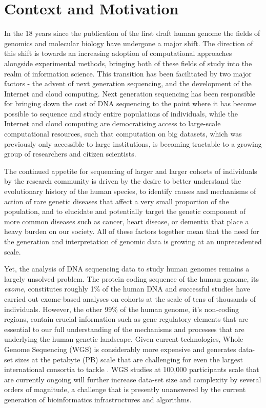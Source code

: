 \section{Context and Motivation}
In the 18 years since the publication of the first draft human genome\autocite{lander2001initial} the fields of genomics and molecular biology have undergone a major shift. The direction of this shift is towards an increasing adoption of computational approaches alongside experimental methods, bringing both of these fields of study into the realm of information science. This transition has been facilitated by two major factors - the advent of next generation sequencing\autocite{schuster2007next}, and the development of the Internet and cloud computing\autocite{buyya2009cloud}. Next generation sequencing has been responsible for bringing down the cost of DNA sequencing to the point where it has become possible to sequence and study entire populations of individuals\autocite{gudbjartsson2015large}, while the Internet and cloud computing are democratising access to large-scale computational resources, such that computation on big datasets, which was previously only accessible to large institutions, is becoming tractable to a growing group of researchers and citizen scientists.

The continued appetite for sequencing of larger and larger cohorts of individuals by the research community is driven by the desire to better understand the evolutionary history of the human species\autocite{jobling2013human}, to identify causes and mechanisms of action of rare genetic diseases that affect a very small proportion of the population\autocite{boycott2013rare}, and to elucidate and potentially target the genetic component of more common diseases such as cancer\autocite{weinstein2013cancer}, heart disease\autocite{bruneau2008developmental}, or dementia\autocite{selkoe1996amyloid} that place a heavy burden on our society. All of these factors together mean that the need for the generation and interpretation of genomic data is growing at an unprecedented scale.

Yet, the analysis of DNA sequencing data to study human genomes remains a largely unsolved problem. The protein coding sequence of the human genome, its \emph{exome}, constitutes roughly 1\% of the human DNA and successful studies have carried out exome-based analyses on cohorts at the scale of tens of thousands of individuals\autocite{lek2016analysis}. However, the other 99\% of the human genome, it's non-coding regions, contain crucial information such as gene regulatory elements\autocite{encode2012integrated} that are essential to our full understanding of the mechanisms and processes that are underlying the human genetic landscape. Given current technologies, Whole Genome Sequencing (WGS) is considerably more expensive and generates data-set sizes at the petabyte (PB) scale that are challenging for even the largest international consortia to tackle \autocite{stein2015data}. WGS studies at 100,000 participants scale that are currently ongoing\autocite{england2016100} will further increase data-set size and complexity by several orders of magnitude, a challenge that is presently unanswered by the current generation of bioinformatics infrastructures and algorithms.  

